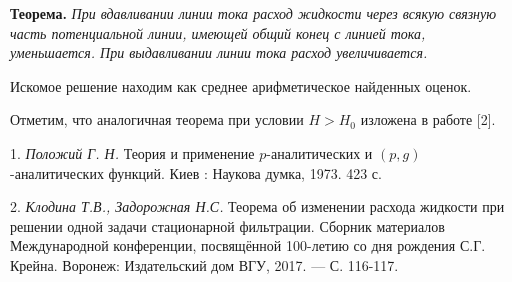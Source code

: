 \textbf{Теорема.} {\it При вдавливании линии тока расход жидкости через всякую
связную часть потенциальной линии, имеющей общий конец с линией тока, уменьшается.
При выдавливании линии тока расход увеличивается.}

Искомое решение находим как среднее арифметическое найденных оценок.

Отметим, что аналогичная теорема при условии $H>H_0$ изложена в работе [2].

\litlist

1. {\it Положий Г. Н.} Теория и применение $p$-аналитических
и $(p,g)$-аналитических функций. Киев : Наукова думка, 1973. 423 с.

2. {\it Клодина Т.В., Задорожная Н.С.} Теорема об изменении расхода жидкости при решении
одной задачи стационарной фильтрации. Сборник материалов Международной конференции,
посвящённой 100-летию со дня рождения С.Г. Крейна. Воронеж: Издательский дом ВГУ, 2017. — С. 116-117.
